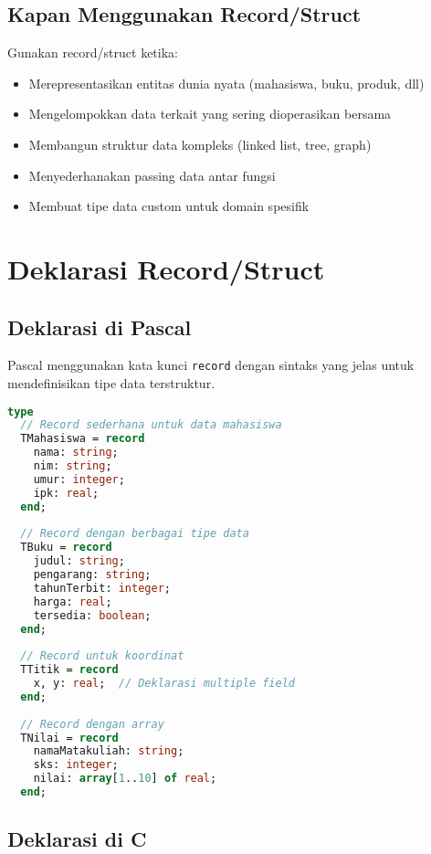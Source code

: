 \documentclass[../main.tex]{subfiles}
\begin{document}
\subsection{Kapan Menggunakan Record/Struct}

Gunakan record/struct ketika:
\begin{itemize}
  \item Merepresentasikan entitas dunia nyata (mahasiswa, buku, produk, dll)
  \item Mengelompokkan data terkait yang sering dioperasikan bersama
  \item Membangun struktur data kompleks (linked list, tree, graph)
  \item Menyederhanakan passing data antar fungsi
  \item Membuat tipe data custom untuk domain spesifik
\end{itemize}

\section{Deklarasi Record/Struct}

\subsection{Deklarasi di Pascal}

Pascal menggunakan kata kunci \texttt{record} dengan sintaks yang jelas untuk mendefinisikan tipe data terstruktur.

\begin{lstlisting}[language=Pascal, caption={Deklarasi record di Pascal}]
type
  // Record sederhana untuk data mahasiswa
  TMahasiswa = record
    nama: string;
    nim: string;
    umur: integer;
    ipk: real;
  end;
  
  // Record dengan berbagai tipe data
  TBuku = record
    judul: string;
    pengarang: string;
    tahunTerbit: integer;
    harga: real;
    tersedia: boolean;
  end;
  
  // Record untuk koordinat
  TTitik = record
    x, y: real;  // Deklarasi multiple field
  end;
  
  // Record dengan array
  TNilai = record
    namaMatakuliah: string;
    sks: integer;
    nilai: array[1..10] of real;
  end;
\end{lstlisting}

\subsection{Deklarasi di C}
\end{document}

